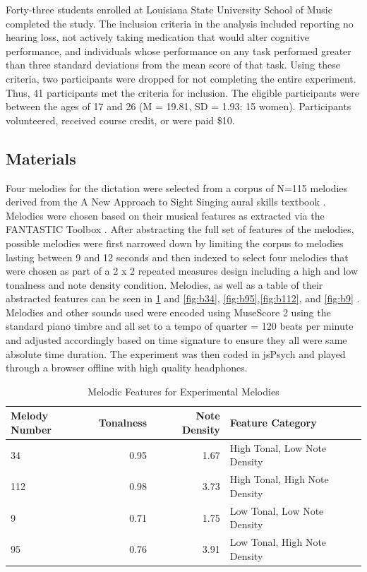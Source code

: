 \documentclass[12pt,]{book}
\begin{document}
Forty-three students enrolled at Louisiana State University School of Music completed the study.
The inclusion criteria in the analysis included reporting no hearing loss, not actively taking medication that would alter cognitive performance, and individuals whose performance on any task performed greater than three standard deviations from the mean score of that task.
Using these criteria, two participants were dropped for not completing the entire experiment.
Thus, 41 participants met the criteria for inclusion.
The eligible participants were between the ages of 17 and 26 (M = 19.81, SD = 1.93; 15 women).
Participants volunteered, received course credit, or were paid \$10.

\hypertarget{materials-1}{%
\subsection{Materials}\label{materials-1}}

Four melodies for the dictation were selected from a corpus of N=115 melodies derived from the A New Approach to Sight Singing aural skills textbook \citep{berkowitzNewApproachSight2011}.
Melodies were chosen based on their musical features as extracted via the FANTASTIC Toolbox \citep{mullensiefenFantasticFeatureANalysis2009}.
After abstracting the full set of features of the melodies, possible melodies were first narrowed down by limiting the corpus to melodies lasting between 9 and 12 seconds and then indexed to select four melodies that were chosen as part of a 2 x 2 repeated measures design including a high and low tonalness and note density condition.
Melodies, as well as a table of their abstracted features can be seen in \ref{tab:expfeaturetable} and \ref{fig:b34}, \ref{fig:b95},\ref{fig:b112}, and \ref{fig:b9} .
Melodies and other sounds used were encoded using MuseScore 2 using the standard piano timbre and all set to a tempo of quarter = 120 beats per minute and adjusted accordingly based on time signature to ensure they all were same absolute time duration.
The experiment was then coded in jsPsych \citep{deleeuwJsPsychJavaScriptLibrary2015} and played through a browser offline with high quality headphones.

\begin{table}[t]

\caption{\label{tab:expfeaturetable}Melodic Features for Experimental Melodies}
\centering
\begin{tabular}{lrrl}
\toprule
Melody Number & Tonalness & Note Density & Feature Category\\
\midrule
34 & 0.95 & 1.67 & High Tonal, Low Note Density\\
112 & 0.98 & 3.73 & High Tonal, High Note Density\\
9 & 0.71 & 1.75 & Low Tonal,  Low Note Density\\
95 & 0.76 & 3.91 & Low Tonal,  High Note Density\\
\bottomrule
\end{tabular}
\end{table}
\end{document}
